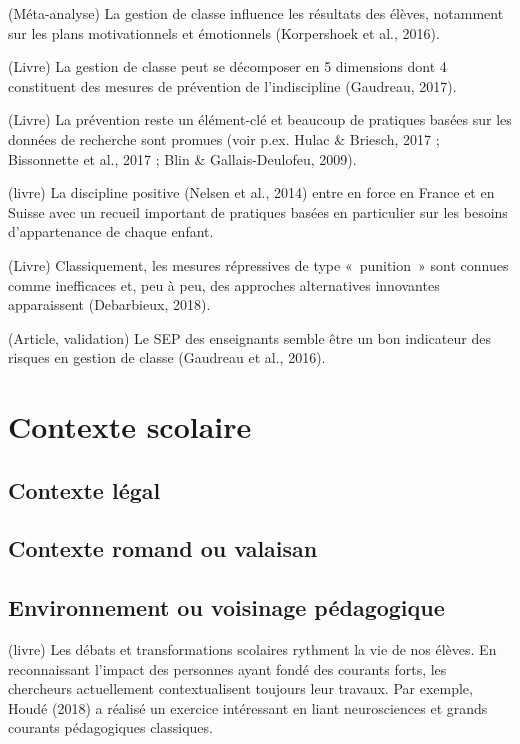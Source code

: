 \documentclass[
  french,
]{article}
\begin{document}
(Méta-analyse) La gestion de classe influence les résultats des élèves, notamment sur les plans motivationnels et émotionnels (Korpershoek et al., 2016).

(Livre) La gestion de classe peut se décomposer en 5 dimensions dont 4 constituent des mesures de prévention de l'indiscipline (Gaudreau, 2017).

(Livre) La prévention reste un élément-clé et beaucoup de pratiques basées sur les données de recherche sont promues (voir p.ex. Hulac \& Briesch, 2017 ; Bissonnette et al., 2017 ; Blin \& Gallais-Deulofeu, 2009).

(livre) La discipline positive (Nelsen et al., 2014) entre en force en France et en Suisse avec un recueil important de pratiques basées en particulier sur les besoins d'appartenance de chaque enfant.

(Livre) Classiquement, les mesures répressives de type «~punition~» sont connues comme inefficaces et, peu à peu, des approches alternatives innovantes apparaissent (Debarbieux, 2018).

(Article, validation) Le SEP des enseignants semble être un bon indicateur des risques en gestion de classe (Gaudreau et al., 2016).

\hypertarget{contexte-scolaire}{%
\section{Contexte scolaire}\label{contexte-scolaire}}

\hypertarget{contexte-luxe9gal}{%
\subsection{Contexte légal}\label{contexte-luxe9gal}}

\hypertarget{contexte-romand-ou-valaisan}{%
\subsection{Contexte romand ou valaisan}\label{contexte-romand-ou-valaisan}}

\hypertarget{environnement-ou-voisinage-puxe9dagogique}{%
\subsection{Environnement ou voisinage pédagogique}\label{environnement-ou-voisinage-puxe9dagogique}}

(livre) Les débats et transformations scolaires rythment la vie de nos élèves. En reconnaissant l'impact des personnes ayant fondé des courants forts, les chercheurs actuellement contextualisent toujours leur travaux. Par exemple, Houdé (2018) a réalisé un exercice intéressant en liant neurosciences et grands courants pédagogiques classiques.
\end{document}
